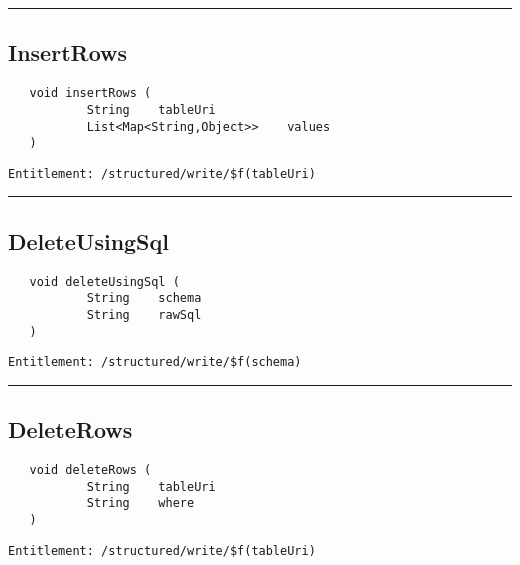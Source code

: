 \rule{12cm}{2pt}
\subsection{InsertRows}
\label{Api:InsertRows}
\begin{verbatim}
   void insertRows (
           String    tableUri
           List<Map<String,Object>>    values
   )
\end{verbatim}
\begin{Verbatim}[fontsize=\small, formatcom=\color{Maroon}]
  Entitlement: /structured/write/$f(tableUri)
\end{Verbatim}



\rule{12cm}{2pt}
\subsection{DeleteUsingSql}
\label{Api:DeleteUsingSql}
\begin{verbatim}
   void deleteUsingSql (
           String    schema
           String    rawSql
   )
\end{verbatim}
\begin{Verbatim}[fontsize=\small, formatcom=\color{Maroon}]
  Entitlement: /structured/write/$f(schema)
\end{Verbatim}



\rule{12cm}{2pt}
\subsection{DeleteRows}
\label{Api:DeleteRows}
\begin{verbatim}
   void deleteRows (
           String    tableUri
           String    where
   )
\end{verbatim}
\begin{Verbatim}[fontsize=\small, formatcom=\color{Maroon}]
  Entitlement: /structured/write/$f(tableUri)
\end{Verbatim}



